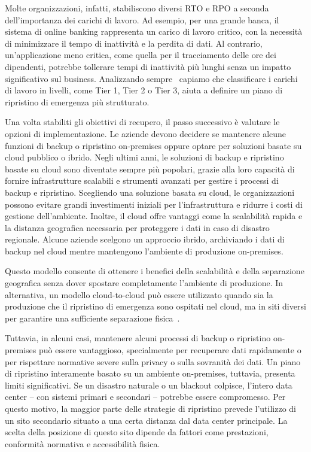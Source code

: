         Molte organizzazioni, infatti, stabiliscono diversi RTO e RPO a seconda dell'importanza dei carichi di lavoro. Ad esempio, per una grande banca, il sistema di online banking rappresenta un carico di lavoro critico, con la necessità di minimizzare il tempo di inattività e la perdita di dati. Al contrario, un'applicazione meno critica, come quella per il tracciamento delle ore dei dipendenti, potrebbe tollerare tempi di inattività più lunghi senza un impatto significativo sul business. Analizzando sempre~\cite{ibm_backup_dis_rec_site} capiamo che classificare i carichi di lavoro in livelli, come Tier 1, Tier 2 o Tier 3, aiuta a definire un piano di ripristino di emergenza più strutturato.

        Una volta stabiliti gli obiettivi di recupero, il passo successivo è valutare le opzioni di implementazione. Le aziende devono decidere se mantenere alcune funzioni di backup o ripristino on-premises oppure optare per soluzioni basate su cloud pubblico o ibrido. Negli ultimi anni, le soluzioni di backup e ripristino basate su cloud sono diventate sempre più popolari, grazie alla loro capacità di fornire infrastrutture scalabili e strumenti avanzati per gestire i processi di backup e ripristino. Scegliendo una soluzione basata su cloud, le organizzazioni possono evitare grandi investimenti iniziali per l'infrastruttura e ridurre i costi di gestione dell'ambiente. Inoltre, il cloud offre vantaggi come la scalabilità rapida e la distanza geografica necessaria per proteggere i dati in caso di disastro regionale. Alcune aziende scelgono un approccio ibrido, archiviando i dati di backup nel cloud mentre mantengono l'ambiente di produzione on-premises.
        
        Questo modello consente di ottenere i benefici della scalabilità e della separazione geografica senza dover spostare completamente l'ambiente di produzione. In alternativa, un modello cloud-to-cloud può essere utilizzato quando sia la produzione che il ripristino di emergenza sono ospitati nel cloud, ma in siti diversi per garantire una sufficiente separazione fisica~\cite{ibm_backup_dis_rec_site}.
        
        Tuttavia, in alcuni casi, mantenere alcuni processi di backup o ripristino on-premises può essere vantaggioso, specialmente per recuperare dati rapidamente o per rispettare normative severe sulla privacy o sulla sovranità dei dati. Un piano di ripristino interamente basato su un ambiente on-premises, tuttavia, presenta limiti significativi. Se un disastro naturale o un blackout colpisce, l'intero data center – con sistemi primari e secondari – potrebbe essere compromesso. Per questo motivo, la maggior parte delle strategie di ripristino prevede l'utilizzo di un sito secondario situato a una certa distanza dal data center principale. La scelta della posizione di questo sito dipende da fattori come prestazioni, conformità normativa e accessibilità fisica.
        
